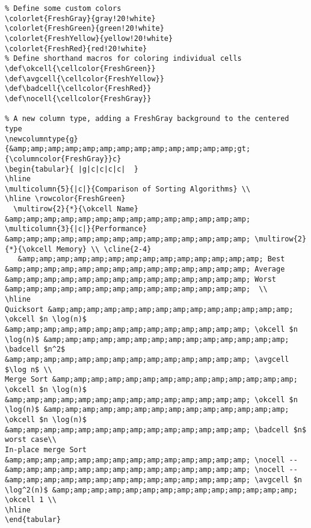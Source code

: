 \begin{lstlisting}
% Define some custom colors
\colorlet{FreshGray}{gray!20!white}
\colorlet{FreshGreen}{green!20!white}
\colorlet{FreshYellow}{yellow!20!white}
\colorlet{FreshRed}{red!20!white}
% Define shorthand macros for coloring individual cells
\def\okcell{\cellcolor{FreshGreen}}
\def\avgcell{\cellcolor{FreshYellow}}
\def\badcell{\cellcolor{FreshRed}}
\def\nocell{\cellcolor{FreshGray}}

% A new column type, adding a FreshGray background to the centered type
\newcolumntype{g}{&amp;amp;amp;amp;amp;amp;amp;amp;amp;amp;amp;amp;amp;gt;{\columncolor{FreshGray}}c}
\begin{tabular}{ |g|c|c|c|c|  }
\hline
\multicolumn{5}{|c|}{Comparison of Sorting Algorithms} \\
\hline \rowcolor{FreshGreen} 
  \multirow{2}{*}{\okcell Name} &amp;amp;amp;amp;amp;amp;amp;amp;amp;amp;amp;amp;amp;amp; \multicolumn{3}{|c|}{Performance} &amp;amp;amp;amp;amp;amp;amp;amp;amp;amp;amp;amp;amp;amp; \multirow{2}{*}{\okcell Memory} \\ \cline{2-4}
   &amp;amp;amp;amp;amp;amp;amp;amp;amp;amp;amp;amp;amp;amp; Best &amp;amp;amp;amp;amp;amp;amp;amp;amp;amp;amp;amp;amp;amp; Average &amp;amp;amp;amp;amp;amp;amp;amp;amp;amp;amp;amp;amp;amp; Worst &amp;amp;amp;amp;amp;amp;amp;amp;amp;amp;amp;amp;amp;amp;  \\
\hline
Quicksort &amp;amp;amp;amp;amp;amp;amp;amp;amp;amp;amp;amp;amp;amp; \okcell $n \log(n)$ &amp;amp;amp;amp;amp;amp;amp;amp;amp;amp;amp;amp;amp;amp; \okcell $n \log(n)$ &amp;amp;amp;amp;amp;amp;amp;amp;amp;amp;amp;amp;amp;amp; \badcell $n^2$ &amp;amp;amp;amp;amp;amp;amp;amp;amp;amp;amp;amp;amp;amp; \avgcell $\log n$ \\
Merge Sort &amp;amp;amp;amp;amp;amp;amp;amp;amp;amp;amp;amp;amp;amp; \okcell $n \log(n)$ &amp;amp;amp;amp;amp;amp;amp;amp;amp;amp;amp;amp;amp;amp; \okcell $n \log(n)$ &amp;amp;amp;amp;amp;amp;amp;amp;amp;amp;amp;amp;amp;amp; \okcell $n \log(n)$ &amp;amp;amp;amp;amp;amp;amp;amp;amp;amp;amp;amp;amp;amp; \badcell $n$ worst case\\
In-place merge Sort &amp;amp;amp;amp;amp;amp;amp;amp;amp;amp;amp;amp;amp;amp; \nocell -- &amp;amp;amp;amp;amp;amp;amp;amp;amp;amp;amp;amp;amp;amp; \nocell -- &amp;amp;amp;amp;amp;amp;amp;amp;amp;amp;amp;amp;amp;amp; \avgcell $n \log^2(n)$ &amp;amp;amp;amp;amp;amp;amp;amp;amp;amp;amp;amp;amp;amp; \okcell 1 \\
\hline
\end{tabular}
\end{lstlisting}

